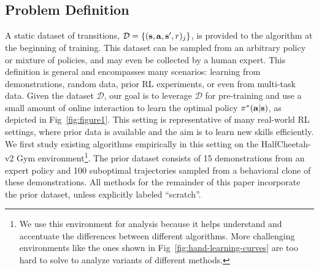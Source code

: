 \documentclass[conference]{IEEEtran}
\begin{document}
\subsection{Problem Definition} \label{sec:challenges_setting}
A static dataset of transitions, \mbox{$\mathcal{D} = \{(\mathbf{s}, \mathbf{a}, \mathbf{s}', r)_j\}$}, is provided to the algorithm at the beginning of training. This dataset can be sampled from an arbitrary policy or mixture of policies, and may even be collected by a human expert. This definition is general and encompasses many scenarios: learning from demonstrations, random data, prior RL experiments, or even from multi-task data. Given the dataset $\mathcal{D}$, our goal is to leverage $\mathcal{D}$ for pre-training and use a small amount of online interaction to learn the optimal policy $\pi^*(\mathbf{a}|\mathbf{s})$, as depicted in Fig~\ref{fig:figure1}. This setting is representative of many real-world RL settings, where prior data is available and the aim is to learn new skills efficiently. We first study existing algorithms empirically in this setting on the HalfCheetah-v2 Gym environment\footnote{We use this environment for analysis because it helps understand and accentuate the differences between different algorithms. More challenging environments like the ones shown in Fig~\ref{fig:hand-learning-curves}
are too hard to solve to analyze variants of different methods.}. The prior dataset consists of 15 demonstrations from an expert policy and 100 suboptimal trajectories sampled from a behavioral clone of these demonstrations. All methods for the remainder of this paper incorporate the prior dataset, unless explicitly labeled ``scratch''.


\end{document}
